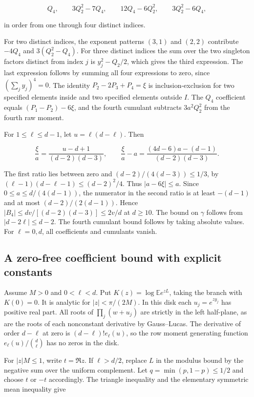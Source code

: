 \documentclass[11pt]{article}
\begin{document}
\[
Q_4,\qquad 3Q_2^2-7Q_4,\qquad 12Q_4-6Q_2^2,\qquad 3Q_2^2-6Q_4,
\]

in order from one through four distinct indices.

For two distinct indices, the exponent patterns $(3,1)$ and $(2,2)$
contribute $-4Q_4$ and $3(Q_2^2-Q_4)$. For three distinct indices
the sum over the two singleton factors distinct from index $j$ is
$y_j^2-Q_2/2$, which gives the third expression. The last expression follows by
summing all four expressions to zero, since $(\sum_j y_j)^4=0$.
The identity $P_2-2P_3+P_4=\xi$ is inclusion-exclusion for two
specified elements inside and two specified elements outside $I$.
The $Q_4$ coefficient equals $(P_1-P_2)-6\xi$, and the fourth
cumulant subtracts $3a^2Q_2^2$ from the fourth raw moment.

For $1\le\ell\le d-1$, let $u=\ell(d-\ell)$. Then

\[
\frac{\xi}{a}=\frac{u-d+1}{(d-2)(d-3)},\qquad
\frac{\xi}{a}-a=\frac{(4d-6)a-(d-1)}{(d-2)(d-3)}.
\]

The first ratio lies between zero and
$(d-2)/(4(d-3))\le1/3$, by
$(\ell-1)(d-\ell-1)\le(d-2)^2/4$.
Thus $|a-6\xi|\le a$. Since $0\le a\le d/(4(d-1))$, the numerator
in the second ratio is at least $-(d-1)$ and at most
$(d-2)/(2(d-1))$. Hence
$|B_4|\le d v/[(d-2)(d-3)]\le2v/d$ at $d\ge10$.
The bound on $\gamma$ follows from $|d-2\ell|\le d-2$.
The fourth cumulant bound follows by taking absolute values.
For $\ell=0,d$, all coefficients and cumulants vanish.

\subsection{A zero-free coefficient bound with explicit constants}

Assume $M>0$ and $0<\ell<d$. Put
$K(z)=\log\mathbb E e^{zL}$, taking the branch with $K(0)=0$.
It is analytic for $|z|<\pi/(2M)$. In this disk each $u_j=e^{zy_j}$
has positive real part. All roots of $\prod_j(w+u_j)$ are strictly in the
left half-plane, as are the roots of each nonconstant derivative
by Gauss--Lucas. The derivative of order $d-\ell$ at zero is
$(d-\ell)!e_\ell(u)$, so the row moment generating function
$e_\ell(u)/\binom d\ell$ has no zeros in the disk.

For $|z|M\le1$, write $t=\Re z$. If $\ell>d/2$, replace $L$ in the
modulus bound by the negative sum over the uniform complement.
Let $q=\min(p,1-p)\le1/2$ and choose $t$ or $-t$ accordingly.
The triangle inequality and the elementary symmetric mean inequality
give
\end{document}
